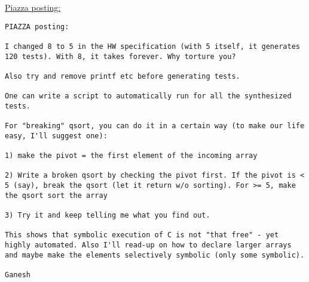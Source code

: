\documentclass[11pt]{article}
\begin{document}
\begin{enumerate}
  \begin{minipage}{\minpagw}
  \end{minipage}

  \underline{Piazza posting:}
  
\begin{verbatim}
PIAZZA posting:

I changed 8 to 5 in the HW specification (with 5 itself, it generates 120 tests). With 8, it takes forever. Why torture you?

Also try and remove printf etc before generating tests.

One can write a script to automatically run for all the synthesized tests.

For "breaking" qsort, you can do it in a certain way (to make our life easy, I'll suggest one):

1) make the pivot = the first element of the incoming array

2) Write a broken qsort by checking the pivot first. If the pivot is < 5 (say), break the qsort (let it return w/o sorting). For >= 5, make the qsort sort the array

3) Try it and keep telling me what you find out.

This shows that symbolic execution of C is not "that free" - yet highly automated. Also I'll read-up on how to declare larger arrays and maybe make the elements selectively symbolic (only some symbolic).

Ganesh
  \end{verbatim}


  


\end{enumerate}
\end{document}
